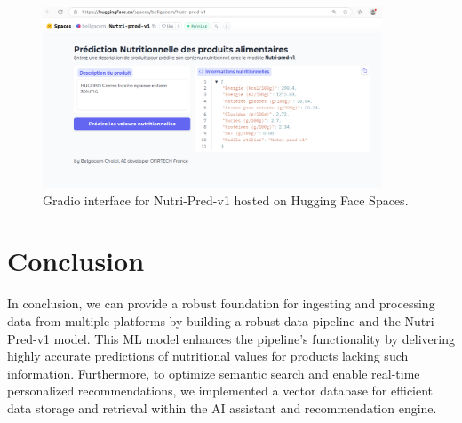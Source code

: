 \begin{figure}[H]
    \centering
    \includegraphics[width=0.90\textwidth]{images/Nutri-pred_Huggingface.png}
    \caption{Gradio interface for Nutri-Pred-v1 hosted on Hugging Face Spaces.}
    \label{fig:gradio-ui}
\end{figure}


\section*{Conclusion}
In conclusion, we can provide a robust foundation for ingesting and processing data from multiple platforms by building a robust data pipeline and the Nutri-Pred-v1 model. This ML model enhances the pipeline’s functionality by delivering highly accurate predictions of nutritional values for products lacking such information.
 Furthermore, to optimize semantic search and enable real-time personalized recommendations, we implemented a vector database for efficient data storage and retrieval within the AI assistant and recommendation engine.


 
